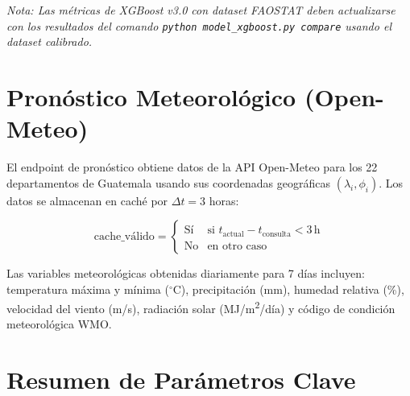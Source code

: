 \documentclass[12pt, a4paper]{article}
\begin{document}
\textit{Nota: Las métricas de XGBoost v3.0 con dataset FAOSTAT deben actualizarse con los resultados del comando \texttt{python model\_xgboost.py compare} usando el dataset calibrado.}

\section{Pronóstico Meteorológico (Open-Meteo)}

El endpoint de pronóstico obtiene datos de la API Open-Meteo para los 22 departamentos de Guatemala usando sus coordenadas geográficas $(\lambda_i, \phi_i)$. Los datos se almacenan en caché por $\Delta t = 3$ horas:

\begin{equation}
  \text{cache\_válido} =
  \begin{cases}
    \text{Sí} & \text{si } t_{\text{actual}} - t_{\text{consulta}} < 3\,\text{h} \\
    \text{No} & \text{en otro caso}
  \end{cases}
  \label{eq:cache}
\end{equation}

Las variables meteorológicas obtenidas diariamente para 7 días incluyen:
temperatura máxima y mínima ($^\circ$C), precipitación (mm), humedad relativa (\%), velocidad del viento (m/s), radiación solar (MJ/m\textsuperscript{2}/día) y código de condición meteorológica WMO.

\section{Resumen de Parámetros Clave}
\end{document}
